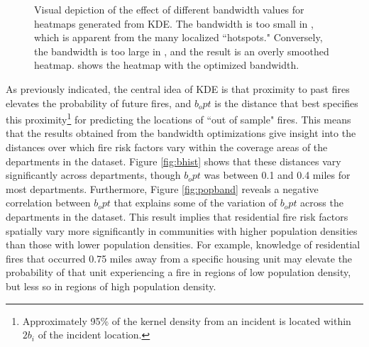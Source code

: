 \documentclass{svjour3}
\begin{document}
\begin{figure}[!htb]
\begin{center}
{          } %
      \end{center}
      \caption{ Visual depiction of the effect of different bandwidth values for heatmaps generated from KDE. The bandwidth is too small in \protect{}, which is apparent from the many localized ``hotspots."  Conversely, the bandwidth is too large in \protect{}, and the result is an overly smoothed heatmap. \protect{} shows the heatmap with the optimized bandwidth.}
     \label{fig:band_comparison}
  \end{figure}
  
 As previously indicated, the central idea of KDE is that proximity to past fires elevates the probability of future fires, and $b_opt$ is the distance that best specifies this proximity\footnote{Approximately 95\% of the kernel density from an incident is located within $2b_i$ of the incident location.} for predicting the locations of ``out of sample" fires. This means that the results obtained from the bandwidth optimizations give insight into the distances over which fire risk factors vary within the coverage areas of the departments in the dataset. Figure \ref{fig:bhist} shows that these distances vary significantly across departments, though $b_opt$ was between 0.1 and 0.4 miles for most departments. Furthermore, Figure \ref{fig:popband} reveals a negative correlation between $b_opt$ that explains some of the variation of $b_opt$ across the departments in the dataset. This result implies that residential fire risk factors spatially vary more significantly in communities with higher population densities than those with lower population densities. For example, knowledge of residential fires that occurred 0.75 miles away from a specific housing unit may elevate the probability of that unit experiencing a fire in regions of low population density, but less so in regions of high population density.
\end{document}
